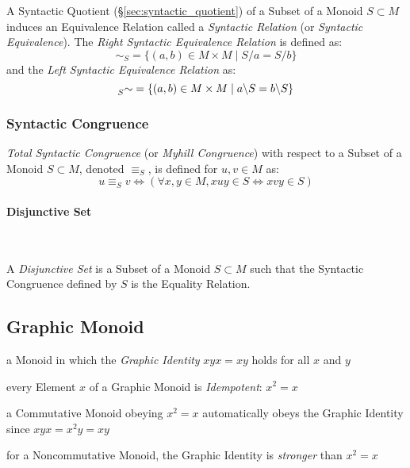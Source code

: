 A Syntactic Quotient (\S\ref{sec:syntactic_quotient}) of a Subset of a
Monoid $S \subset M$ induces an Equivalence Relation called a
\emph{Syntactic Relation} (or \emph{Syntactic Equivalence}). The
\emph{Right Syntactic Equivalence Relation} is defined as:
\[
  \sim_S = \{ (a,b) \in M \times M \;|\; S/a = S/b\}
\]
and the \emph{Left Syntactic Equivalence Relation} as:
\[
  \prescript{}{S}{\sim} = \{ (a,b) \in M \times M \;|\;
  a \backslash S = b \backslash S \}
\]



\subsubsection{Syntactic Congruence}\label{sec:syntactic_congruence}

\emph{Total Syntactic Congruence} (or \emph{Myhill Congruence}) with
respect to a Subset of a Monoid $S \subset M$, denoted $\equiv_S$, is
defined for $u,v \in M$ as:
\[
  u \equiv_S v \Leftrightarrow
  (\forall x,y \in M, xuy \in S \Leftrightarrow xvy \in S)
\]



\paragraph{Disjunctive Set}\label{sec:disjunctive_set}\hfill \\\hfill

A \emph{Disjunctive Set} is a Subset of a Monoid $S \subset M$ such
that the Syntactic Congruence defined by $S$ is the Equality Relation.



\subsection{Graphic Monoid}\label{sec:graphic_monoid}

a Monoid in which the \emph{Graphic Identity} $xyx = xy$ holds for all $x$ and
$y$

every Element $x$ of a Graphic Monoid is \emph{Idempotent}: $x^2 = x$

a Commutative Monoid obeying $x^2 = x$ automatically obeys the Graphic Identity
since $xyx = x^2y = xy$

for a Noncommutative Monoid, the Graphic Identity is \emph{stronger} than $x^2
= x$

